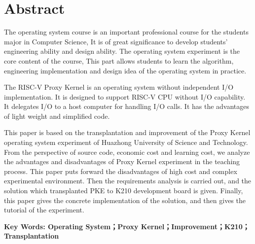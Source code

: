 \vspace*{-2mm}

\begin{spacing}{0.95}
  \centering
  \heiti{}\textbf{\thesisTitleEN}
\end{spacing}

\vspace*{17mm}

{\let\clearpage\relax \chapter*{
  \textmd{Abstract}\vskip -3bp}}
\setcounter{page}{2}

\setlength{\parskip}{0em}

The operating system course is an important professional course for the students major in Computer Science,
It is of great significance to develop students' engineering ability and design ability.
The operating system experiment is the core content of the course,
This part allows students to learn the algorithm, 
engineering implementation and design idea of the operating system in practice.

The RISC-V Proxy Kernel is an operating system without independent I/O implementation.
It is designed to support RISC-V CPU without I/O capability.
It delegates I/O to a host computer for handling I/O calls.
It has the advantages of light weight and simplified code.

This paper is based on the transplantation and improvement of the Proxy Kernel operating system experiment of Huazhong University of Science and Technology.
From the perspective of source code, economic cost and learning cost,
we analyze the advantages and disadvantages of Proxy Kernel experiment in the teaching process.
This paper puts forward the disadvantages of high cost and complex experimental environment.
Then the requirements analysis is carried out, and the solution which transplanted PKE to K210 development board is given.
Finally, this paper gives the concrete implementation of the solution,
and then gives the tutorial of the experiment.

\vspace{3ex}\noindent\textbf{Key Words: Operating System；Proxy Kernel；Improvement；K210；Transplantation}
\newpage
